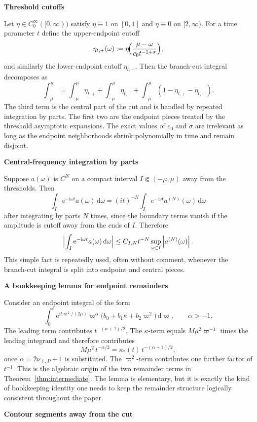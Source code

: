 \documentclass[12pt]{article}
\numberwithin{equation}{section}
\theoremstyle{plain}
\theoremstyle{definition}
\theoremstyle{remark}
\newcommand{\ii}{\mathrm i}
\newcommand{\ee}{\mathrm e}
\newcommand{\dd}{\mathrm d}
\newcommand{\om}{\omega}
\newcommand{\vp}{\varpi}
\newcommand{\kap}{\kappa}
\newcommand{\eps}{\varepsilon}
\newcommand{\abs}[1]{\left|#1\right|}
\newcommand{\appheading}[1]{\par\medskip\noindent\textbf{#1}\par\smallskip\noindent}
\begin{document}
\appheading{Threshold cutoffs}

Let $\eta\in C_0^\infty([0,\infty))$ satisfy $\eta\equiv1$ on $[0,1]$ and $\eta\equiv0$ on $[2,\infty)$.  For a time parameter $t$ define the upper-endpoint cutoff
\[
   \eta_{t,+}(\om):=\eta\!\Bigl(\frac{\mu-\om}{c_0 t^{-1+\sigma}}\Bigr),
\]
and similarly the lower-endpoint cutoff $\eta_{t,-}$.  Then the branch-cut integral decomposes as
\[
   \int_{-\mu}^{\mu}
   =
   \int_{-\mu}^{\mu}\eta_{t,+}
   +
   \int_{-\mu}^{\mu}\eta_{t,-}
   +
   \int_{-\mu}^{\mu}(1-\eta_{t,+}-\eta_{t,-}).
\]
The third term is the central part of the cut and is handled by repeated integration by parts.  The first two are the endpoint pieces treated by the threshold asymptotic expansions.  The exact values of $c_0$ and $\sigma$ are irrelevant as long as the endpoint neighborhoods shrink polynomially in time and remain disjoint.

\appheading{Central-frequency integration by parts}

Suppose $a(\om)$ is $C^N$ on a compact interval $I\Subset(-\mu,\mu)$ away from the thresholds.  Then
\[
   \int_I \ee^{-\ii\om t}a(\om)\,\dd\om
   =
   (it)^{-N}\int_I \ee^{-\ii\om t}a^{(N)}(\om)\,\dd\om
\]
after integrating by parts $N$ times, since the boundary terms vanish if the amplitude is cutoff away from the ends of $I$.  Therefore
\[
   \Bigl|\int_I \ee^{-\ii\om t}a(\om)\,\dd\om\Bigr|
   \le
   C_{I,N}t^{-N}\sup_{\om\in I}\abs{a^{(N)}(\om)}.
\]
This simple fact is repeatedly used, often without comment, whenever the branch-cut integral is split into endpoint and central pieces.

\appheading{A bookkeeping lemma for endpoint remainders}

Consider an endpoint integral of the form
\[
   \int_0^\eps \ee^{\ii t\vp^2/(2\mu)}\vp^\alpha
   \bigl(
      b_0+b_1\kap+b_2\vp^2
   \bigr)\,\dd\vp,
   \qquad
   \alpha>-1.
\]
The leading term contributes $t^{-(\alpha+1)/2}$.  The $\kap$-term equals $M\mu^2\vp^{-1}$ times the leading integrand and therefore contributes
\[
   M\mu^2\,t^{-\alpha/2}
   =
   \kap_*(t)\,t^{-(\alpha+1)/2},
\]
once $\alpha=2\nu_{\ell,P}+1$ is substituted.  The $\vp^2$-term contributes one further factor of $t^{-1}$.  This is the algebraic origin of the two remainder terms in Theorem~\ref{thm:intermediate}.  The lemma is elementary, but it is exactly the kind of bookkeeping identity one needs to keep the remainder structure logically consistent throughout the paper.

\appheading{Contour segments away from the cut}
\end{document}
